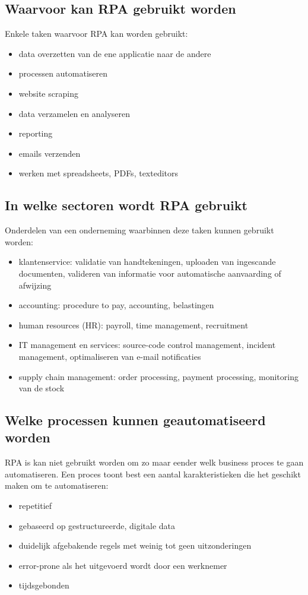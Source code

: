 \subsection{Waarvoor kan RPA gebruikt worden}
Enkele taken waarvoor RPA kan worden gebruikt:
\begin{itemize}
	\item data overzetten van de ene applicatie naar de andere
	\item processen automatiseren
	\item website scraping
	\item data verzamelen en analyseren
	\item reporting
	\item emails verzenden
	\item werken met spreadsheets, PDFs, texteditors
\end{itemize}
\autocite{everythingRPA} \autocite{idrRPA}

\subsection{In welke sectoren wordt RPA gebruikt}
Onderdelen van een onderneming waarbinnen deze taken kunnen gebruikt worden:
\begin{itemize}
	\item klantenservice: validatie van handtekeningen, uploaden van ingescande documenten, valideren van informatie voor automatische aanvaarding of afwijzing
	\item accounting: procedure to pay, accounting, belastingen
	\item human resources (HR): payroll, time management, recruitment
	\item IT management en services: source-code control management, incident management, optimaliseren van e-mail notificaties
	\item supply chain management: order processing, payment processing, monitoring van de stock
\end{itemize}
\autocite{everythingRPA}

\subsection{Welke processen kunnen geautomatiseerd worden}
RPA is kan niet gebruikt worden om zo maar eender welk business proces te gaan automatiseren. Een proces toont best een aantal karakteristieken die het geschikt maken om te automatiseren:
\begin{itemize}
	\item repetitief
	\item gebaseerd op gestructureerde, digitale data
	\item duidelijk afgebakende regels met weinig tot geen uitzonderingen
	\item error-prone als het uitgevoerd wordt door een werknemer
	\item tijdsgebonden
\end{itemize}

